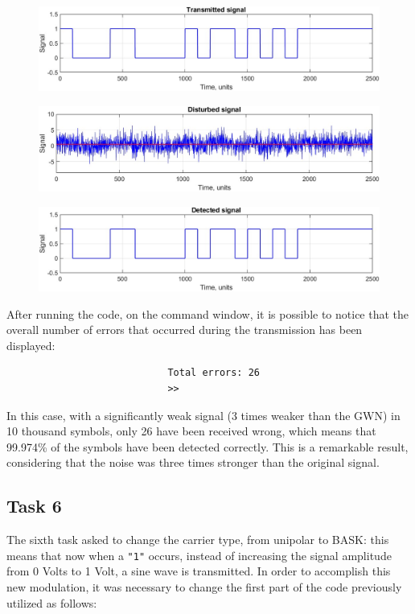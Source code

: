 \begin{figure}[h!]
    \centering
    \includegraphics[width = \textwidth]{lab-2/imgs/task5_Transmitted.jpg}
\end{figure}
\vspace{-15px}
\begin{figure}[h!]
    \centering
    \includegraphics[width = \textwidth]{lab-2/imgs/task5_Noise.jpg}
\end{figure}
\vspace{-15px}
\begin{figure}[h!]
    \centering
    \includegraphics[width = \textwidth]{lab-2/imgs/task5_Detected.jpg}
\end{figure}

\FloatBarrier\noindent After running the code, on the command window, it is possible to notice that the overall number of errors that occurred during the transmission has been displayed:
\begin{verbatim}
                            Total errors: 26
                            >> 
\end{verbatim}
In this case, with a significantly weak signal (3 times weaker than the GWN) in 10 thousand symbols, only 26 have been received wrong, which means that 99.974\% of the symbols have been detected correctly. This is a remarkable result, considering that the noise was three times stronger than the original signal.


% 
\subsection*{Task 6}
The sixth task asked to change the carrier type, from unipolar to BASK: this means that now when a \texttt{"1"} occurs, instead of increasing the signal amplitude from 0 Volts to 1 Volt, a sine wave is transmitted. In order to accomplish this new modulation, it was necessary to change the first part of the code previously utilized as follows:

